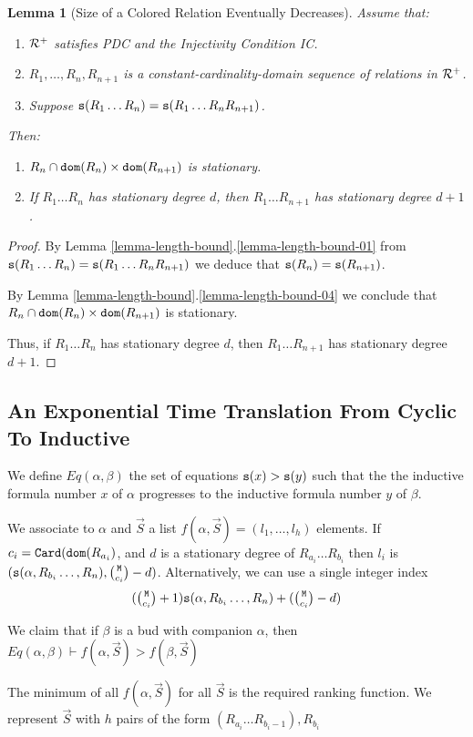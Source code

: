 \documentclass{lmcs}
\newtheorem{lemma}[theorem]{Lemma}
\begin{document}
\begin{lemma}[Size of a Colored Relation Eventually Decreases]
\label{lemma-size-colored-relation}
Assume that:

\begin{enumerate}
\item
${\mathcal R}^+$ satisfies PDC and the Injectivity Condition IC. 
\item 
$R_1, \ldots, R_n, R_{n+1}$ is a constant-cardinality-domain sequence of 
relations in ${\mathcal R}^+$. 
\item
Suppose ${\tt s}(R_1 \ldots R_n) = {\tt s}(R_1 \ldots R_n R_{n+1})$.
\end{enumerate}

Then:

\begin{enumerate}
\item
$R_n \cap {\tt dom}(R_{n}) \times {\tt dom}(R_{n+1})$ is stationary.
\item
If $R_1 \ldots R_n$ has stationary degree $d$, then 
$R_1 \ldots R_{n+1} $ has stationary degree $d+1$.
\end{enumerate}

\end{lemma}

\begin{proof}
By Lemma \ref{lemma-length-bound}.\ref{lemma-length-bound-01}
from ${\tt s}(R_1 \ldots R_n) = {\tt s}(R_1 \ldots R_n R_{n+1})$
we deduce that ${\tt s}(R_n) = {\tt s}(R_{n+1})$.

By Lemma \ref{lemma-length-bound}.\ref{lemma-length-bound-04}
we conclude that $R_n \cap {\tt dom}(R_{n}) \times {\tt dom}(R_{n+1})$ is stationary.

Thus, if $R_1 \ldots R_n$ has stationary degree $d$, then 
$R_1 \ldots R_{n+1} $ has stationary degree $d+1$.

\end{proof}

\subsection{An Exponential Time Translation From Cyclic To Inductive}
We define $Eq(\alpha, \beta)$ the set of equations ${\tt s}(x) > {\tt s}(y)$ such that the
the inductive formula number $x$ of $\alpha$ progresses to the inductive formula number $y$
 of $\beta$.
 
 We associate to $\alpha$ and $\vec{S}$ a list 
 $f(\alpha,\vec{S})=(l_1, \ldots, l_h)$ elements. If $c_i = {\tt Card}({\tt dom}(R_{a_i})$,
 and $d$ is a stationary degree of $R_{a_i} \ldots R_{b_i}$
 then $l_i$ is
 $(
 \size(\alpha, R_{b_i}\ldots, R_n), 
 \newton{\MaxInd}{c_i} - d
 )$.
Alternatively, we can use a single integer index
$$
(\newton{\MaxInd}{c_i}+1)\size(\alpha, R_{b_i}\ldots, R_n) + (\newton{\MaxInd}{c_i} - d)
$$

We claim that if $\beta$ is a bud with companion $\alpha$, then 
$Eq(\alpha, \beta) \vdash f(\alpha,\vec{S}) > f(\beta,\vec{S})$

The minimum of all $f(\alpha,\vec{S})$ for all $\vec{S}$ is the required ranking function.
We represent $\vec{S}$ with $h$ pairs of the form $(R_{a_i}\ldots R_{b_i-1}),R_{b_i}$




 

 
\end{document}
